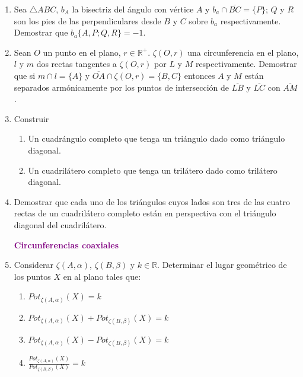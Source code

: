 \documentclass[12pt]{report}
\numberwithin{section}{chapter}
\newcommand{\R}{\mathbb R}
\begin{document}
\begin{enumerate}
\item Sea $\triangle ABC$, $b_A$ la bisectriz del \'angulo con v\'ertice $A$ y $b_a \cap \overline{BC}=\{P\}$; $Q$ y $R$ son los pies de las perpendiculares desde $B$ y $C$ sobre $b_a$ respectivamente. Demostrar que $b_a\{A,P;Q,R\}= -1$.

%

\item Sean $O$ un punto en el plano, $r \in \R^+$. $\zeta (O,r)$ una circunferencia en el plano, $l$ y $m$ dos rectas tangentes a $\zeta(O,r)$ por $L$ y $M$ respectivamente. Demostrar que si $m \cap l = \{A\} $ y  $\overline{OA} \cap \zeta(O,r)=\{B,C\}$ entonces $A$ y $M$ están separados armónicamente por los puntos de intersección de $\overline{LB}$ y $\overline{LC}$ con $\overline{AM}$.

\item Construir
\begin{enumerate}
\item Un cuadrángulo completo que tenga un triángulo dado como triángulo diagonal.
\item Un cuadrilátero completo que tenga un trilátero dado como trilátero diagonal.
\end{enumerate}
                                                           
\item Demostrar que cada uno de los triángulos cuyos lados son tres de las cuatro rectas de un cuadrilátero completo están en perspectiva con el triángulo diagonal del cuadrilátero.

\begin{center}
\textcolor{purple}{\textbf{\large Circunferencias coaxiales}}
\end{center}


\item Considerar $\zeta(A, \alpha)$, $\zeta(B,\beta)$ y $k \in \R$. Determinar el lugar geométrico de los puntos $X$ en al plano tales que:
\begin{enumerate}
\item $Pot_{\zeta(A,\alpha)} (X)=k$
\item $Pot_{\zeta(A,\alpha)} (X) + Pot_{\zeta(B,\beta)} (X)=k$
\item $Pot_{\zeta(A,\alpha)} (X) - Pot_{\zeta(B,\beta)} (X)=k$
\item $\frac{Pot_{\zeta(A,\alpha)} (X)}{Pot_{\zeta(B,\beta)} (X)}=k$
\end{enumerate}


\end{enumerate}
\end{document}
